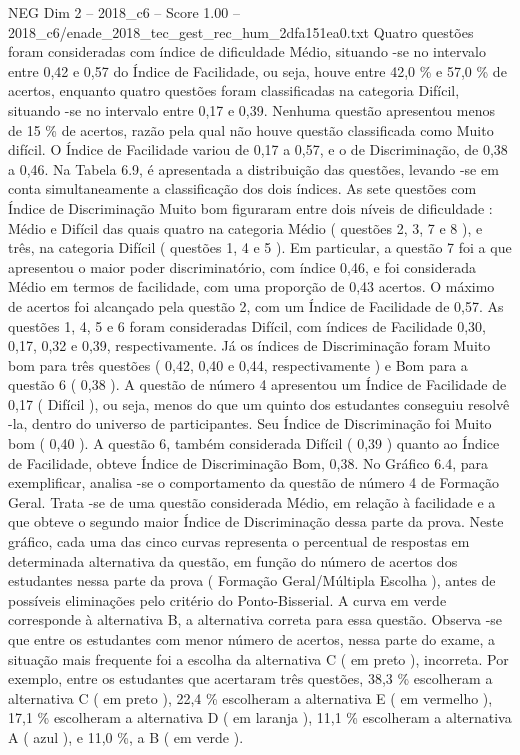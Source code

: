 \begin{textsample}{NEG Dim 2 – 2018\_c6 – Score 1.00 – 2018\_c6/enade\_2018\_tec\_gest\_rec\_hum\_2dfa151ea0.txt}
Quatro questões foram consideradas com índice de dificuldade Médio, situando -se no intervalo entre 0,42 e 0,57 do Índice de Facilidade, ou seja, houve entre 42,0 \% e 57,0 \% de acertos, enquanto quatro questões foram classificadas na categoria Difícil, situando -se no intervalo entre 0,17 e 0,39.
Nenhuma questão apresentou menos de 15 \% de acertos, razão pela qual não houve questão classificada como Muito difícil.
O Índice de Facilidade variou de 0,17 a 0,57, e o de Discriminação, de 0,38 a 0,46.
Na Tabela 6.9, é apresentada a distribuição das questões, levando -se em conta simultaneamente a classificação dos dois índices.
As sete questões com Índice de Discriminação Muito bom figuraram entre dois níveis de dificuldade : Médio e Difícil das quais quatro na categoria Médio ( questões 2, 3, 7 e 8 ), e três, na categoria Difícil ( questões 1, 4 e 5 ).
Em particular, a questão 7 foi a que apresentou o maior poder discriminatório, com índice 0,46, e foi considerada Médio em termos de facilidade, com uma proporção de 0,43 acertos.
O máximo de acertos foi alcançado pela questão 2, com um Índice de Facilidade de 0,57.
As questões 1, 4, 5 e 6 foram consideradas Difícil, com índices de Facilidade 0,30, 0,17, 0,32 e 0,39, respectivamente.
Já os índices de Discriminação foram Muito bom para três questões ( 0,42, 0,40 e 0,44, respectivamente ) e Bom para a questão 6 ( 0,38 ).
A questão de número 4 apresentou um Índice de Facilidade de 0,17 ( Difícil ), ou seja, menos do que um quinto dos estudantes conseguiu resolvê -la, dentro do universo de participantes.
Seu Índice de Discriminação foi Muito bom ( 0,40 ).
A questão 6, também considerada Difícil ( 0,39 ) quanto ao Índice de Facilidade, obteve Índice de Discriminação Bom, 0,38.
No Gráfico 6.4, para exemplificar, analisa -se o comportamento da questão de número 4 de Formação Geral.
Trata -se de uma questão considerada Médio, em relação à facilidade e a que obteve o segundo maior Índice de Discriminação dessa parte da prova.
Neste gráfico, cada uma das cinco curvas representa o percentual de respostas em determinada alternativa da questão, em função do número de acertos dos estudantes nessa parte da prova ( Formação Geral/Múltipla Escolha ), antes de possíveis eliminações pelo critério do Ponto-Bisserial.
A curva em verde corresponde à alternativa B, a alternativa correta para essa questão.
Observa -se que entre os estudantes com menor número de acertos, nessa parte do exame, a situação mais frequente foi a escolha da alternativa C ( em preto ), incorreta.
Por exemplo, entre os estudantes que acertaram três questões, 38,3 \% escolheram a alternativa C ( em preto ), 22,4 \% escolheram a alternativa E ( em vermelho ), 17,1 \% escolheram a alternativa D ( em laranja ), 11,1 \% escolheram a alternativa A ( azul ), e 11,0 \%, a B ( em verde ).

\end{textsample}
